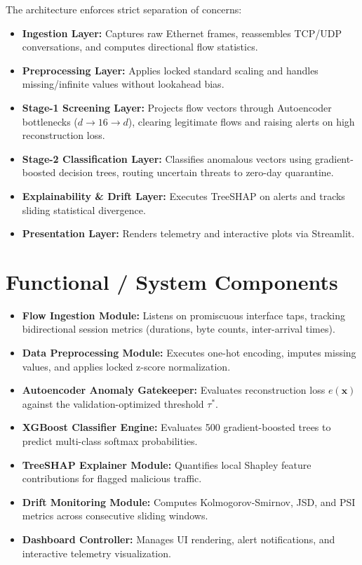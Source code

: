 \documentclass[12pt,a4paper]{report}
\begin{document}
The architecture enforces strict separation of concerns:
\begin{itemize}
    \item \textbf{Ingestion Layer:} Captures raw Ethernet frames, reassembles TCP/UDP conversations, and computes directional flow statistics.
    \item \textbf{Preprocessing Layer:} Applies locked standard scaling and handles missing/infinite values without lookahead bias.
    \item \textbf{Stage-1 Screening Layer:} Projects flow vectors through Autoencoder bottlenecks ($d \to 16 \to d$), clearing legitimate flows and raising alerts on high reconstruction loss.
    \item \textbf{Stage-2 Classification Layer:} Classifies anomalous vectors using gradient-boosted decision trees, routing uncertain threats to zero-day quarantine.
    \item \textbf{Explainability \& Drift Layer:} Executes TreeSHAP on alerts and tracks sliding statistical divergence.
    \item \textbf{Presentation Layer:} Renders telemetry and interactive plots via Streamlit.
\end{itemize}

\section{Functional / System Components}
\begin{itemize}
    \item \textbf{Flow Ingestion Module:} Listens on promiscuous interface taps, tracking bidirectional session metrics (durations, byte counts, inter-arrival times).
    \item \textbf{Data Preprocessing Module:} Executes one-hot encoding, imputes missing values, and applies locked z-score normalization.
    \item \textbf{Autoencoder Anomaly Gatekeeper:} Evaluates reconstruction loss $e(\mathbf{x})$ against the validation-optimized threshold $\tau^*$.
    \item \textbf{XGBoost Classifier Engine:} Evaluates 500 gradient-boosted trees to predict multi-class softmax probabilities.
    \item \textbf{TreeSHAP Explainer Module:} Quantifies local Shapley feature contributions for flagged malicious traffic.
    \item \textbf{Drift Monitoring Module:} Computes Kolmogorov-Smirnov, JSD, and PSI metrics across consecutive sliding windows.
    \item \textbf{Dashboard Controller:} Manages UI rendering, alert notifications, and interactive telemetry visualization.
\end{itemize}
\end{document}
